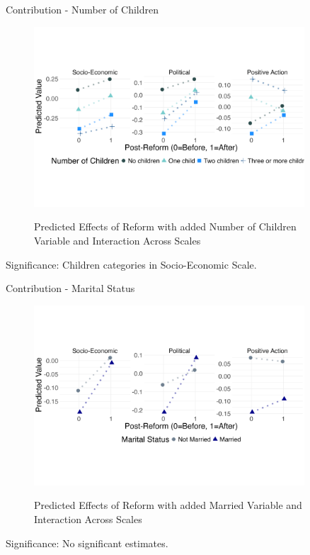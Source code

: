 \documentclass{beamer}
\begin{document}
	\begin{frame}{Contribution - Number of Children}
		
		\begin{figure}
			\centering
			\captionsetup{justification=centering, labelsep=period} 
			\caption{Predicted Effects of Reform with added Number of Children Variable and Interaction Across Scales}
			\vspace*{-1cm}
			\includegraphics[width=0.9\textwidth]{children_plot}
			\label{fig:children_plot}
		\end{figure}
		\vspace{-1.5cm}	
		Significance: Children categories in Socio-Economic Scale. 
	\end{frame}
	
	\begin{frame}{Contribution - Marital Status}
		
		\begin{figure}
			\centering
			\captionsetup{justification=centering, labelsep=period} 
			\caption{Predicted Effects of Reform with added Married Variable and Interaction Across Scales}
			\vspace*{-1cm}
			\includegraphics[width=0.9\textwidth]{married_plot}
			\label{fig:married_plot}
		\end{figure}
		\vspace{-1.5cm}	
		Significance: No significant estimates. 
	\end{frame}
	
\end{document}
